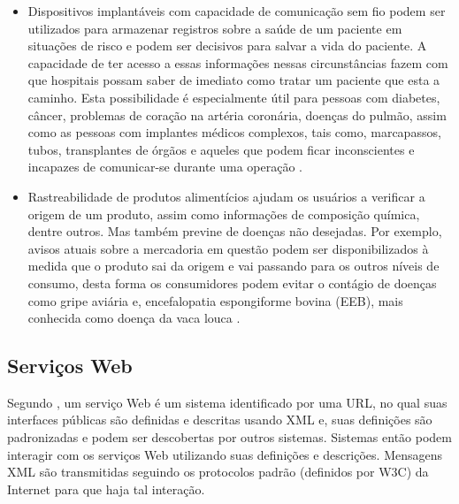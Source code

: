 \begin{itemize}
\item Dispositivos implantáveis com capacidade de comunicação sem fio podem ser utilizados para armazenar registros sobre a saúde de um paciente em situações de risco e podem ser decisivos para salvar a vida do paciente. A capacidade de ter acesso a essas informações nessas circunstâncias fazem com que hospitais possam saber de imediato como tratar um paciente que esta a caminho. Esta possibilidade é especialmente útil para pessoas com diabetes, câncer, problemas de coração na artéria coronária, doenças do pulmão, assim como as pessoas com implantes médicos complexos, tais como, marcapassos, tubos, transplantes de órgãos e aqueles que podem ficar inconscientes e incapazes de comunicar-se durante uma operação \cite{Weber:2010}.
\item Rastreabilidade de produtos alimentícios ajudam os usuários a verificar a origem de um produto, assim como informações de composição química, dentre outros. Mas também previne de doenças não desejadas. Por exemplo, avisos atuais sobre a mercadoria em questão podem ser disponibilizados à medida que o produto sai da origem e vai passando para os outros níveis de consumo, desta forma os consumidores podem evitar o contágio de doenças como gripe aviária e, encefalopatia espongiforme bovina (EEB), mais conhecida como doença da vaca louca \cite{Weber:2010}.
\end{itemize}

\subsection{Serviços Web}
\label{ws:webservices}
Segundo \cite{Dustdar:2005}, um serviço Web é um sistema identificado por uma URL\footnotemark {}, no qual suas interfaces públicas são definidas e descritas usando XML\footnotemark {} e, suas definições são padronizadas e podem ser descobertas por outros sistemas. Sistemas então podem interagir com os serviços Web utilizando suas definições e descrições. Mensagens XML são transmitidas seguindo os protocolos padrão (definidos por W3C\footnotemark {}) da Internet para que haja tal interação.

